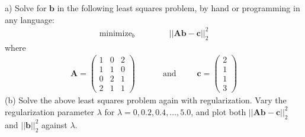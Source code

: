 \documentclass[12pt]{article}
\newenvironment{problem}[2][Problem]{\begin{trivlist}
\item[\hskip \labelsep {\bfseries #1}\hskip \labelsep {\bfseries #2.}]}{\end{trivlist}}
\begin{document}
\begin{problem}{2}
	(a) Solve for $\textbf{b}$ in the following least squares problem, by hand or programming in any language:
	\begin{align*}
		\text{minimize}_b \hspace{40pt} & ||\textbf{Ab} - \textbf{c}||_2^2
	\end{align*}
	where 
	\begin{align*}
		\textbf{A} = \begin{pmatrix}1 & 0 & 2 \\ 1 & 1 & 0 \\ 0 & 2 & 1 \\ 2 & 1 & 1 \end{pmatrix} \hspace{30pt} & \text{and} \hspace{30pt} \textbf{c} = \begin{pmatrix}2 \\ 1 \\ 1 \\ 3\end{pmatrix}
	\end{align*}
	(b) Solve the above least squares problem again with regularization. Vary the regularization parameter $\lambda$ for $\lambda = 0, 0.2, 0.4,\dots,5.0$, and plot both $||\textbf{Ab} - \textbf{c}||_2^2$ and $||\textbf{b}||_2^2$ against $\lambda$.
\end{problem}
\end{document}
